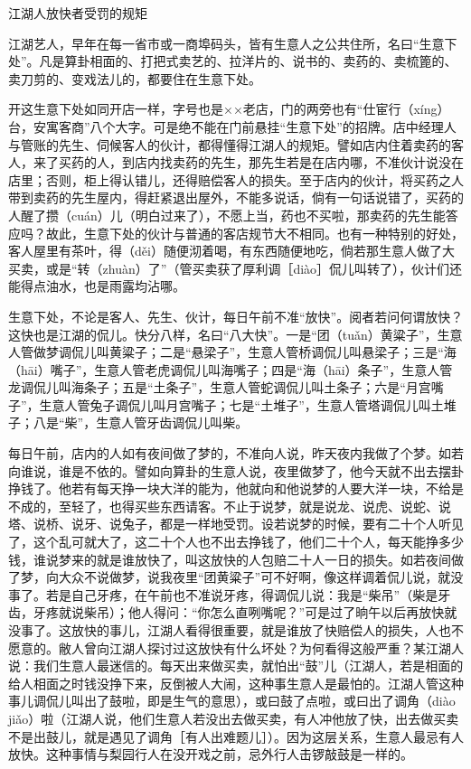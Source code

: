 \documentclass[12pt,UTF8]{ctexbook}
\begin{document}
江湖人放快者受罚的规矩


江湖艺人，早年在每一省市或一商埠码头，皆有生意人之公共住所，名曰“生意下处”。凡是算卦相面的、打把式卖艺的、拉洋片的、说书的、卖药的、卖梳篦的、卖刀剪的、变戏法儿的，都要住在生意下处。

开这生意下处如同开店一样，字号也是××老店，门的两旁也有“仕宦行（xíng）台，安寓客商”八个大字。可是绝不能在门前悬挂“生意下处”的招牌。店中经理人与管账的先生、伺候客人的伙计，都得懂得江湖人的规矩。譬如店内住着卖药的客人，来了买药的人，到店内找卖药的先生，那先生若是在店内哪，不准伙计说没在店里；否则，柜上得认错儿，还得赔偿客人的损失。至于店内的伙计，将买药之人带到卖药的先生屋内，得赶紧退出屋外，不能多说话，倘有一句话说错了，买药的人醒了攒（cuán）儿（明白过来了），不愿上当，药也不买啦，那卖药的先生能答应吗？故此，生意下处的伙计与普通的客店规节大不相同。也有一种特别的好处，客人屋里有茶叶，得（děi）随便沏着喝，有东西随便地吃，倘若那生意人做了大买卖，或是“转（zhuàn）了”（管买卖获了厚利调［diào］侃儿叫转了），伙计们还能得点油水，也是雨露均沾哪。

生意下处，不论是客人、先生、伙计，每日午前不准“放快”。阅者若问何谓放快？这快也是江湖的侃儿。快分八样，名曰“八大快”。一是“团（tuǎn）黄粱子”，生意人管做梦调侃儿叫黄粱子；二是“悬梁子”，生意人管桥调侃儿叫悬梁子；三是“海（hāi）嘴子”，生意人管老虎调侃儿叫海嘴子；四是“海（hāi）条子”，生意人管龙调侃儿叫海条子；五是“土条子”，生意人管蛇调侃儿叫土条子；六是“月宫嘴子”，生意人管兔子调侃儿叫月宫嘴子；七是“土堆子”，生意人管塔调侃儿叫土堆子；八是“柴”，生意人管牙齿调侃儿叫柴。

每日午前，店内的人如有夜间做了梦的，不准向人说，昨天夜内我做了个梦。如若向谁说，谁是不依的。譬如向算卦的生意人说，夜里做梦了，他今天就不出去摆卦挣钱了。他若有每天挣一块大洋的能为，他就向和他说梦的人要大洋一块，不给是不成的，至轻了，也得买些东西请客。不止于说梦，就是说龙、说虎、说蛇、说塔、说桥、说牙、说兔子，都是一样地受罚。设若说梦的时候，要有二十个人听见了，这个乱可就大了，这二十个人也不出去挣钱了，他们二十个人，每天能挣多少钱，谁说梦来的就是谁放快了，叫这放快的人包赔二十人一日的损失。如若夜间做了梦，向大众不说做梦，说我夜里“团黄粱子”可不好啊，像这样调着侃儿说，就没事了。若是自己牙疼，在午前也不准说牙疼，得调侃儿说：我是“柴吊”（柴是牙齿，牙疼就说柴吊）；他人得问：“你怎么直咧嘴呢？”可是过了晌午以后再放快就没事了。这放快的事儿，江湖人看得很重要，就是谁放了快赔偿人的损失，人也不愿意的。敝人曾向江湖人探讨过这放快有什么坏处？为何看得这般严重？某江湖人说：我们生意人最迷信的。每天出来做买卖，就怕出“鼓”儿（江湖人，若是相面的给人相面之时钱没挣下来，反倒被人大闹，这种事生意人是最怕的。江湖人管这种事儿调侃儿叫出了鼓啦，即是生气的意思），或曰鼓了点啦，或曰出了调角（diào jiǎo）啦（江湖人说，他们生意人若没出去做买卖，有人冲他放了快，出去做买卖不是出鼓儿，就是遇见了调角［有人出难题儿］）。因为这层关系，生意人最忌有人放快。这种事情与梨园行人在没开戏之前，忌外行人击锣敲鼓是一样的。
\end{document}
